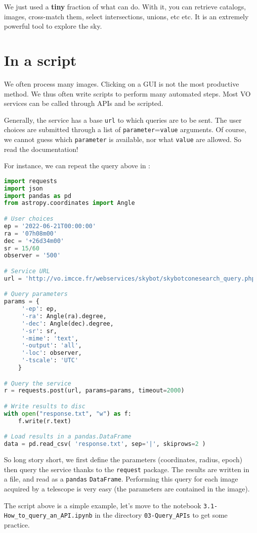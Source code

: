   We just used a \textbf{tiny} fraction of what \aladin can do.
  With it, you can retrieve catalogs, images, cross-match them,
  select intersections, unions, etc etc. It is an extremely powerful
  tool to explore the sky.




\section{In a script}

We often process many images. Clicking on a GUI is not the most
productive method. We thus often write scripts to perform
many automated steps. Most VO services can be called through APIs
and be scripted.

Generally, the service has a base \texttt{url} to which queries are
to be sent. The user choices are submitted through a list of \texttt{parameter}=\texttt{value}
arguments. Of course, we cannot guess which \texttt{parameter} is
available, nor what \texttt{value} are allowed. So read the documentation!

For instance, we can repeat the query above in \python:

\begin{lstlisting}[language=python]
import requests
import json
import pandas as pd
from astropy.coordinates import Angle

# User choices
ep = '2022-06-21T00:00:00'
ra = '07h08m00'
dec = '+26d34m00'
sr = 15/60
observer = '500'

# Service URL
url = 'http://vo.imcce.fr/webservices/skybot/skybotconesearch_query.php?'

# Query parameters
params = {
     '-ep': ep,
     '-ra': Angle(ra).degree,
     '-dec': Angle(dec).degree,
     '-sr': sr,
     '-mime': 'text',
     '-output': 'all',
     '-loc': observer, 
     '-tscale': 'UTC'
    }

# Query the service
r = requests.post(url, params=params, timeout=2000)

# Write results to disc
with open("response.txt", "w") as f:
    f.write(r.text)

# Load results in a pandas.DataFrame
data = pd.read_csv( 'response.txt', sep='|', skiprows=2 )
\end{lstlisting}

  So long story short, we first
  define the parameters (coordinates, radius, epoch) then query the
  \skybot service thanks to the \texttt{request} package. The results
  are written in a file, and read as a \texttt{pandas} \texttt{DataFrame}.
  Performing this query for each image acquired by a telescope is very easy
  (the parameters are contained in the image).

The script above is a simple example, let's move to the notebook
\texttt{3.1-How\_to\_query\_an\_API.ipynb} in the directory 
\texttt{03-Query\_APIs} to get some practice.


